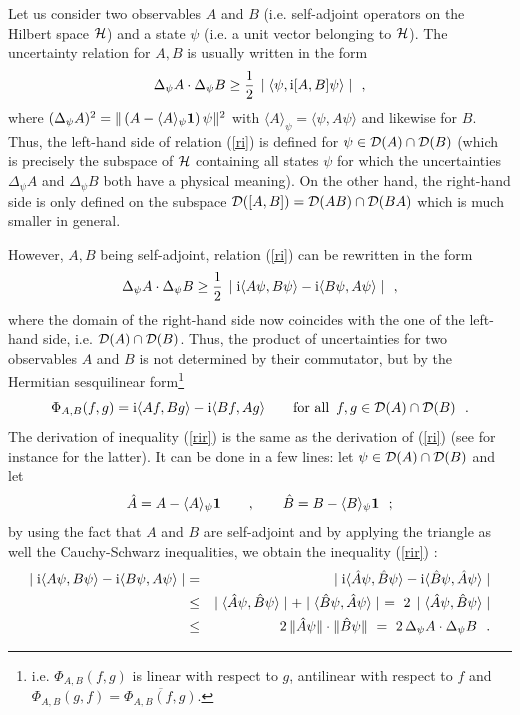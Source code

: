 \documentclass[12pt]{report}
\def\underline{\relax}
\begin{document}
\underline{{\bf (6)}}
Let us consider two observables $A$ and $B$ 
(i.e. self-adjoint operators 
on the Hilbert space ${\cal H}$) and a state $\psi$ (i.e. a unit vector 
belonging to ${\cal H}$).
The uncertainty relation for $A,B$ is usually written in the form 
\cite{gap}
\begin{equation}
\label{ri}
\Delta_{\psi} A \cdot
\Delta_{\psi} B \geq \displaystyle{1 \over 2} \, \mid \langle \psi ,
{\rm i} [A, B] \psi \rangle \mid
\ \ ,
\end{equation}
where 
$(\Delta_{\psi} A)^2 = \| \left( A -
\langle A\rangle_{\psi} {\bf 1} \right) \psi \|^2$
with 
$\langle A\rangle_{\psi} = \langle \psi , A\psi \rangle$ and likewise 
for $B$.
Thus, the left-hand side of relation (\ref{ri}) is defined for 
$\psi \in {\cal D}(A) \cap {\cal D}(B)$
(which is precisely the subspace of ${\cal H}$ containing all states 
$\psi$ for which the uncertainties 
$\Delta_{\psi} A$ and 
$\Delta_{\psi} B$ both have a physical meaning). 
On the other hand, the right-hand side is only defined on the subspace 
${\cal D} ([A,B]) =
{\cal D} (AB) \cap
{\cal D} (BA)$ which is much smaller in general. 

However, $A,B$ being self-adjoint, relation (\ref{ri}) can be rewritten 
in the form \cite{krau}
\begin{equation}
\label{rir}
\Delta_{\psi} A \cdot
\Delta_{\psi} B \geq \displaystyle{1 \over 2} \, \mid {\rm i} \langle A\psi ,
B \psi \rangle - {\rm i} \langle B\psi , A \psi \rangle \mid
\ \ ,
\end{equation}
where the domain  of the right-hand side 
now coincides with the one of the left-hand side, i.e.  
${\cal D}(A) \cap {\cal D}(B)$.
Thus, the product of  
uncertainties for two observables 
$A$ and $B$ is not determined by their commutator, but by the 
 Hermitian sesquilinear form\footnote{i.e. 
 $\Phi_{A,B} (f,g)$ is linear with respect to $g$, 
 antilinear with respect to $f$
 and $\Phi_{A,B} (g,f) = \overline{\Phi_{A,B} (f,g)}$.}
\[
\Phi_{A,B} (f,g) =
{\rm i} \langle A f, Bg \rangle
-{\rm i} \langle B f , A g \rangle
\qquad \mbox{for all} \ \,  f,g \in
{\cal D}(A) \cap {\cal D}(B)
\ \ .
\]
The derivation of inequality (\ref{rir}) is the same as the 
derivation 
of (\ref{ri}) (see for instance \cite{krey} for the latter). 
It can be done in a few lines: 
 let $\psi \in {\cal D}(A) \cap {\cal D} (B)$ and let 
\[
\hat A = A - \langle A \rangle _{\psi} {\bf 1}
\qquad , \qquad
\hat B = B - \langle B \rangle _{\psi} {\bf 1}
\ \ ;
\]
by using the fact that $A$ and $B$ are self-adjoint and by applying
the triangle as well the Cauchy-Schwarz inequalities,
we obtain the inequality (\ref{rir}) :
\begin{eqnarray*}
\mid {\rm i} \langle A \psi , B \psi  \rangle
-{\rm i} \langle B \psi , A \psi \rangle \mid
& = &
\mid {\rm i} \langle \hat A \psi , \hat B \psi  \rangle
-{\rm i} \langle \hat B \psi , \hat A \psi \rangle \mid
\\
& \leq &
\mid  \langle \hat A \psi , \hat B \psi  \rangle  \mid +
\mid  \langle \hat B \psi , \hat A \psi  \rangle  \mid
\ = \ 2 \,
\mid  \langle \hat A \psi , \hat B \psi  \rangle  \mid
\\
& \leq &  2 \,
\| \hat A \psi \| \cdot
\| \hat B \psi \|  \ = \
2\, \Delta_{\psi} A \cdot
\Delta_{\psi} B
\ \ .
\end{eqnarray*}
\end{document}

